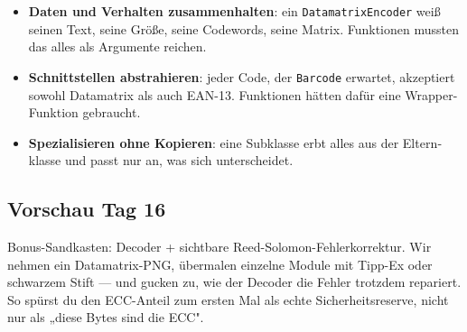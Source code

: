 \begin{itemize}
\item \textbf{Daten und Verhalten zusammenhalten}: ein
  \texttt{DatamatrixEncoder} weiß seinen Text, seine Größe, seine
  Codewords, seine Matrix. Funktionen mussten das alles als
  Argumente reichen.
\item \textbf{Schnittstellen abstrahieren}: jeder Code, der
  \texttt{Barcode} erwartet, akzeptiert sowohl Datamatrix als auch
  EAN-13. Funktionen hätten dafür eine Wrapper-Funktion gebraucht.
\item \textbf{Spezialisieren ohne Kopieren}: eine Subklasse erbt
  alles aus der Eltern­klasse und passt nur an, was sich
  unterscheidet.
\end{itemize}

\subsection*{Vorschau Tag 16}

Bonus-Sandkasten: Decoder + sichtbare Reed-Solomon-Fehlerkorrektur.
Wir nehmen ein Datamatrix-PNG, übermalen einzelne Module mit Tipp-Ex
oder schwarzem Stift — und gucken zu, wie der Decoder die Fehler
trotzdem repariert. So spürst du den ECC-Anteil zum ersten Mal als
echte Sicherheitsreserve, nicht nur als „diese Bytes sind die ECC".
